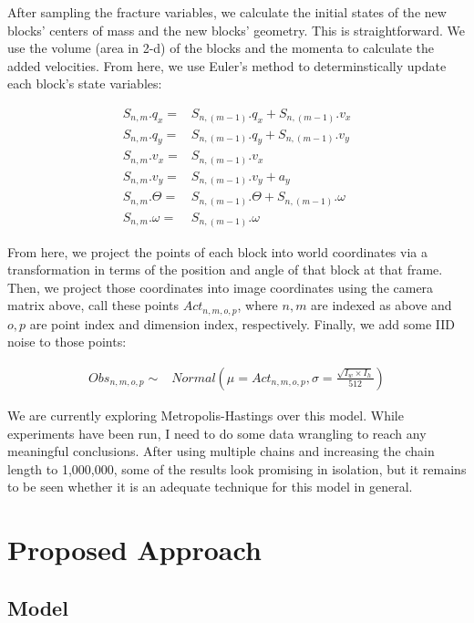 \documentclass[10pt,twocolumn,letterpaper]{article}
\begin{document}
After sampling the fracture variables, we calculate the initial states of the 
new blocks' centers of mass and the new blocks' geometry. This is straightforward. We 
use the volume (area in 2-d) of the blocks and the momenta to calculate the 
added velocities. From here, we use Euler's method to determinstically update 
each block's state variables:

\begin{align*}
       S_{n,m}.q_x =& S_{n,(m-1)}.q_x + S_{n,(m-1)}.v_x \\
       S_{n,m}.q_y =& S_{n,(m-1)}.q_y + S_{n,(m-1)}.v_y \\
       S_{n,m}.v_x =& S_{n,(m-1)}.v_x \\
       S_{n,m}.v_y =& S_{n,(m-1)}.v_y + a_y \\
    S_{n,m}.\Theta =& S_{n,(m-1)}.\Theta + S_{n,(m-1)}.\omega \\
    S_{n,m}.\omega =& S_{n,(m-1)}.\omega
\end{align*}

From here, we project the points of each block into world coordinates via a 
transformation in terms of the position and angle of that block at that 
frame. Then, we project those coordinates into image coordinates using the 
camera matrix above, call these points $Act_{n,m,o,p}$, where $n, m$ are 
indexed as above and $o, p$ are point index and dimension 
index, respectively. Finally, we add some IID noise to those points:

\begin{align*}
    Obs_{n,m,o,p} \sim& Normal(\mu=Act_{n,m,o,p},\sigma=\frac{\sqrt{I_w \times I_h}}{512})
\end{align*}

We are currently exploring Metropolis-Hastings over this model. While experiments 
have been run, I need to do some data wrangling to reach any meaningful 
conclusions. After using multiple chains and increasing the chain length to 
1,000,000, some of the results look promising in isolation, but it remains to be 
seen whether it is an adequate technique for this model in general.

\section{Proposed Approach}

\subsection{Model}
\end{document}
